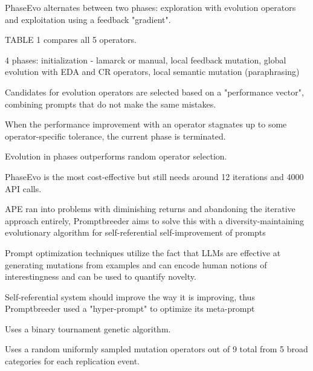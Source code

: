 PhaseEvo alternates between two phases: exploration with evolution operators and exploitation using a feedback "gradient". \cite{cui2024phaseevounifiedincontextprompt}

TABLE 1  compares all 5 operators.  \cite{cui2024phaseevounifiedincontextprompt}

4 phases: initialization - lamarck or manual, local feedback mutation, global evolution with EDA and CR operators, local semantic mutation (paraphrasing) \cite{cui2024phaseevounifiedincontextprompt}

Candidates for evolution operators are selected based on a "performance vector", combining prompts that do not make the same mistakes.  \cite{cui2024phaseevounifiedincontextprompt}

When the performance improvement with an operator stagnates up to some operator-specific tolerance, the current phase is terminated. \cite{cui2024phaseevounifiedincontextprompt}

Evolution in phases outperforms random operator selection. \cite{cui2024phaseevounifiedincontextprompt}

PhaseEvo is the most cost-effective but still needs around 12 iterations and 4000 API calls. \cite{cui2024phaseevounifiedincontextprompt}


APE \cite{zhou2023largelanguagemodelshumanlevel} ran into problems with diminishing returns and abandoning the iterative approach entirely, Promptbreeder aims to solve this with a diversity-maintaining evolutionary algorithm for self-referential self-improvement of prompts \cite{fernando2023promptbreederselfreferentialselfimprovementprompt}

Prompt optimization techniques utilize the fact that LLMs are effective at generating mutations from examples and can encode human notions of interestingness and can be used to quantify novelty. \cite{fernando2023promptbreederselfreferentialselfimprovementprompt}

Self-referential system should improve the way it is improving, thus Promptbreeder used a "hyper-prompt" to optimize its meta-prompt \cite{fernando2023promptbreederselfreferentialselfimprovementprompt}

Uses a binary tournament genetic algorithm. \cite{fernando2023promptbreederselfreferentialselfimprovementprompt}

Uses a random uniformly sampled mutation operators out of 9 total from 5 broad categories for each replication event. \cite{fernando2023promptbreederselfreferentialselfimprovementprompt}


